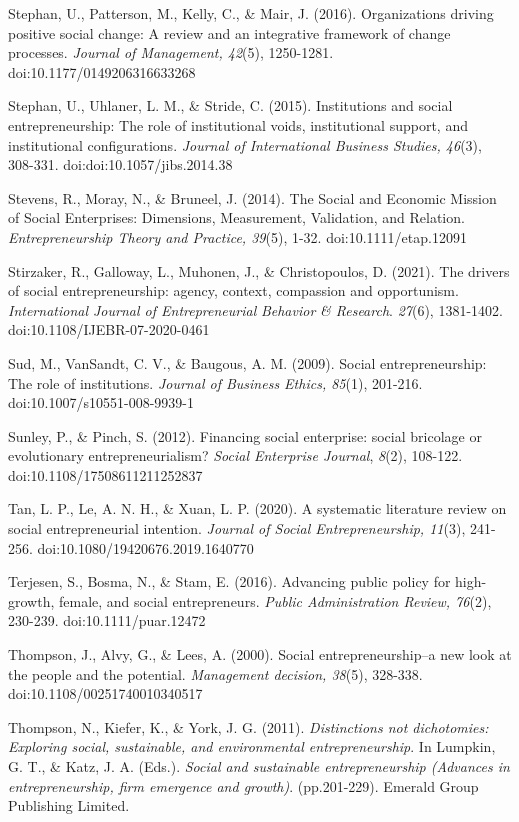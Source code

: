 \documentclass{article}
\begin{document}
Stephan, U., Patterson, M., Kelly, C., \& Mair, J. (2016). Organizations driving positive social change: A review and an integrative framework of change processes. \emph{Journal of Management, 42}(5), 1250-1281. doi:10.1177/0149206316633268

Stephan, U., Uhlaner, L. M., \& Stride, C. (2015). Institutions and social entrepreneurship: The role of institutional voids, institutional support, and institutional configurations. \emph{Journal of International Business Studies, 46}(3), 308-331. doi:doi:10.1057/jibs.2014.38

Stevens, R., Moray, N., \& Bruneel, J. (2014). The Social and Economic Mission of Social Enterprises: Dimensions, Measurement, Validation, and Relation. \emph{Entrepreneurship Theory and Practice, 39}(5), 1-32. doi:10.1111/etap.12091

Stirzaker, R., Galloway, L., Muhonen, J., \& Christopoulos, D. (2021). The drivers of social entrepreneurship: agency, context, compassion and opportunism. \emph{International Journal of Entrepreneurial }\emph{Behavior}\emph{ \& Research}. \emph{27}(6), 1381-1402. doi:10.1108/IJEBR-07-2020-0461

Sud, M., VanSandt, C. V., \& Baugous, A. M. (2009). Social entrepreneurship: The role of institutions. \emph{Journal of Business Ethics, 85}(1), 201-216. doi:10.1007/s10551-008-9939-1

Sunley, P., \& Pinch, S. (2012). Financing social enterprise: social bricolage or evolutionary entrepreneurialism? \emph{Social Enterprise Journal}, \emph{8}(2), 108-122. doi:10.1108/17508611211252837

Tan, L. P., Le, A. N. H., \& Xuan, L. P. (2020). A systematic literature review on social entrepreneurial intention. \emph{Journal of Social Entrepreneurship, 11}(3), 241-256. doi:10.1080/19420676.2019.1640770

Terjesen, S., Bosma, N., \& Stam, E. (2016). Advancing public policy for high-growth, female, and social entrepreneurs. \emph{Public Administration Review, 76}(2), 230-239. doi:10.1111/puar.12472

Thompson, J., Alvy, G., \& Lees, A. (2000). Social entrepreneurship--a new look at the people and the potential. \emph{Management decision, 38}(5), 328-338. doi:10.1108/00251740010340517

Thompson, N., Kiefer, K., \& York, J. G. (2011). \emph{Distinctions not dichotomies: Exploring social, sustainable, and environmental entrepreneurship}. In Lumpkin, G. T., \& Katz, J. A. (Eds.). \emph{Social and sustainable entrepreneurship (Advances in entrepreneurship, firm emergence and growth)}. (pp.201-229). Emerald Group Publishing Limited.
\end{document}
